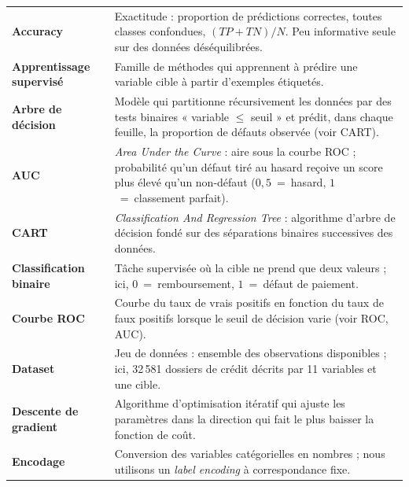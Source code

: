 \begingroup
\setlength{\extrarowheight}{0.35em}   %
\begin{longtable}{@{}>{\raggedright\bfseries}p{3.2cm}@{\hspace{0.4cm}}>{\raggedright\arraybackslash}p{\dimexpr\textwidth-3.7cm\relax}@{}}

Accuracy & Exactitude : proportion de prédictions correctes, toutes classes
  confondues, $(TP+TN)/N$. Peu informative seule sur des données déséquilibrées. \\

Apprentissage supervisé & Famille de méthodes qui apprennent à prédire une
  variable cible à partir d'exemples étiquetés. \\

Arbre de décision & Modèle qui partitionne récursivement les données par des
  tests binaires « variable $\leq$ seuil » et prédit, dans chaque feuille, la
  proportion de défauts observée (voir CART). \\

AUC & \emph{Area Under the Curve} : aire sous la courbe ROC ; probabilité qu'un
  défaut tiré au hasard reçoive un score plus élevé qu'un non-défaut
  ($0{,}5$~=~hasard, $1$~=~classement parfait). \\

CART & \emph{Classification And Regression Tree} : algorithme d'arbre de décision
  fondé sur des séparations binaires successives des données. \\

Classification binaire & Tâche supervisée où la cible ne prend que deux
  valeurs ; ici, $0$~=~remboursement, $1$~=~défaut de paiement. \\

Courbe ROC & Courbe du taux de vrais positifs en fonction du taux de faux
  positifs lorsque le seuil de décision varie (voir ROC, AUC). \\

Dataset & Jeu de données : ensemble des observations disponibles ; ici,
  32\,581 dossiers de crédit décrits par 11 variables et une cible. \\

Descente de gradient & Algorithme d'optimisation itératif qui ajuste les
  paramètres dans la direction qui fait le plus baisser la fonction de coût. \\

Encodage & Conversion des variables catégorielles en nombres ; nous utilisons un
  \emph{label encoding} à correspondance fixe. \\


\end{longtable}
